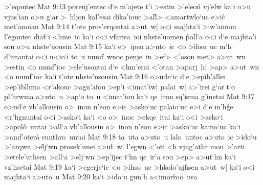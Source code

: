 >'eqontec\bibvsend
\vs Mat 9:13
poreuj'entec
d`e
m'ajete
t'i
>estin
>'eleo\r{n}
vj'elw
ka`i
o>u
vjus'ian
o>u
g`ar
>~hljon
kal'esai
dika'iouc
>al\r{l}>
<amartwlo`uc
e>ic\r{}
met'anoian\bibvsend
\vs Mat 9:14
t'ote
pros'erqontai
a>ut~w|
o<i
majhta`i
>iw'annou
l'egontec
dia\r{t}`i
<hme~ic
ka`i
o<i
vfarisa~ioi
nhste'uomen
\r{p}oll`a
o<i
d`e
majhta'i
sou
o>u
nhste'uousin\bibvsend
\vs Mat 9:15
ka`i
e>~ipen
a>uto~ic
<o
>ihso~uc
m`h
d'unantai
o<i
u<io`i
to~u
numf~wnoc
penje~in
>ef>
<'oson
met>
a>ut~wn
>estin
<o
numf'ioc
>ele'usontai
d`e
<hm'erai
<'otan
>aparj~h|
>ap>
a>ut~wn
<o
numf'ioc
ka`i
t'ote
nhste'usousin\bibvsend
\vs Mat 9:16
o>ude`ic
d`e
>epib'allei
>ep'iblhma
<r'akouc
>agn'afou
>ep`i
<imat'iw|
palai~w|
a>'irei
g`ar
t`o
pl'hrwma
a>uto~u
>ap`o
to~u
<imat'iou
ka`i
qe~iron
sq'isma
g'inetai\bibvsend
\vs Mat 9:17
o>ud`e
vb'allousin
o>~inon
n'eon
e>ic
>asko`uc
palaio`uc
e>i
d`e
m'h\r{g}e
<r'hgnuntai
o<i
>asko`i
ka`i
<o
o>~inoc
>ekqe~itai
ka`i
o<i
>asko`i
>apol\r{o}~untai
>all`a
vb'allousin
o>~inon
n'eon
e>ic
>asko`uc
kaino`uc
ka`i
>amf'oter\r{a}
sunthro~untai\bibvsend
\vs Mat 9:18
ta~uta
a>uto~u
lalo~untoc
a>uto~ic
>ido`u
>'arqwn
>e\r{l}j`wn
prosek'unei
a>u\r{t}~w|
l'egwn
<'oti
<h
vjug'athr
mou
>'arti
>etele'uthsen
>all`a
>elj`wn
>ep'ijec
t`hn
qe~ir'a
sou
>ep>
a>ut`hn
ka`i
vz'hsetai\bibvsend
\vs Mat 9:19
ka`i
>egerje`ic
<o
>ihso~uc
>hkolo'uj\r{h}sen
a>ut~w|
ka`i
o<i
majhta`i
a>uto~u\bibvsend
\vs Mat 9:20
ka`i
>ido`u
gun`h
a<imor\r{r}oo~usa
